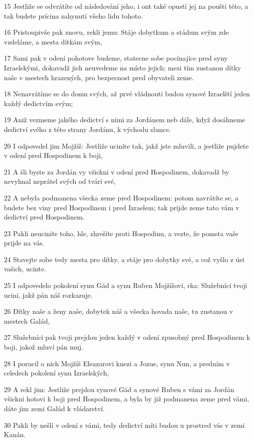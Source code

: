 \par 15 Jestliže se odvrátíte od následování jeho, i ont také opustí jej na poušti této, a tak budete prícina zahynutí všeho lidu tohoto.
\par 16 Pristoupivše pak znovu, rekli jemu: Stáje dobytkum a stádum svým zde vzdeláme, a mesta dítkám svým,
\par 17 Sami pak v odení pohotove budeme, statecne sobe pocínajíce pred syny Izraelskými, dokavadž jich neuvedeme na místo jejich; mezi tím zustanou dítky naše v mestech hrazených, pro bezpecnost pred obyvateli zeme.
\par 18 Nenavrátíme se do domu svých, až prvé vládnouti budou synové Izraelští jeden každý dedictvím svým;
\par 19 Aniž vezmeme jakého dedictví s nimi za Jordánem neb dále, když dosáhneme dedictví svého z této strany Jordánu, k východu slunce.
\par 20 I odpovedel jim Mojžíš: Jestliže uciníte tak, jakž jste mluvili, a jestliže pujdete v odení pred Hospodinem k boji,
\par 21 A šli byste za Jordán vy všickni v odení pred Hospodinem, dokavadž by nevyhnal neprátel svých od tvári své,
\par 22 A nebyla podmanena všecka zeme pred Hospodinem: potom navrátíte se, a budete bez viny pred Hospodinem i pred Izraelem; tak prijde zeme tato vám v dedictví pred Hospodinem.
\par 23 Pakli neuciníte toho, hle, zhrešíte proti Hospodinu, a vezte, že pomsta vaše prijde na vás.
\par 24 Stavejte sobe tedy mesta pro dítky, a stáje pro dobytky své, a což vyšlo z úst vašich, ucinte.
\par 25 I odpovedelo pokolení synu Gád a synu Ruben Mojžíšovi, rka: Služebníci tvoji uciní, jakž pán náš rozkazuje.
\par 26 Dítky naše a ženy naše, dobytek náš a všecka hovada naše, tu zustanou v mestech Galád,
\par 27 Služebníci pak tvoji prejdou jeden každý v odení zpusobný pred Hospodinem k boji, jakož mluví pán muj.
\par 28 I porucil o nich Mojžíš Eleazarovi knezi a Jozue, synu Nun, a predním v celedech pokolení synu Izraelských,
\par 29 A rekl jim: Jestliže prejdou synové Gád a synové Ruben s vámi za Jordán všickni hotovi k boji pred Hospodinem, a byla by již podmanena zeme pred vámi, dáte jim zemi Galád k vládarství.
\par 30 Pakli by nešli v odení s vámi, tedy dedictví míti budou u prostred vás v zemi Kanán.

